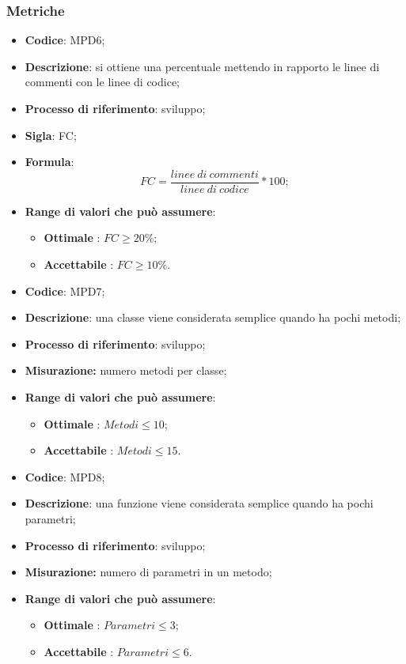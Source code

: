 \subsubsection{Metriche}
\vspace{-1cm}
\begin{itemize}
	\item \textbf{Codice}: MPD6;
	\item \textbf{Descrizione}: si ottiene una percentuale mettendo in rapporto le linee di commenti con le linee di codice;
	\item \textbf{Processo di riferimento}: sviluppo;
	\item \textbf{Sigla}: FC;
	\item \textbf{Formula}: \[FC=\frac{linee \ di \ commenti}{linee \ di \ codice}\ast100;\]
	\item \textbf{Range di valori che può assumere}: 
		\begin{itemize}
			\item \textbf{Ottimale} : $FC \geq 20 \%$;
			\item \textbf{Accettabile} : $FC \geq 10 \%$.
		\end{itemize}
\end{itemize}
\vspace{-1cm}
\begin{itemize}
	\item \textbf{Codice}: MPD7;
	\item \textbf{Descrizione}: una classe viene considerata semplice quando ha pochi metodi;
	\item \textbf{Processo di riferimento}: sviluppo;
	\item \textbf{Misurazione:} numero metodi per classe;
	\item \textbf{Range di valori che può assumere}: 
		\begin{itemize}
			\item \textbf{Ottimale} : $Metodi \leq 10$;
			\item \textbf{Accettabile} : $Metodi \leq 15$.
		\end{itemize}
\end{itemize}
\vspace{-1cm}
\begin{itemize}
	\item \textbf{Codice}: MPD8;
	\item \textbf{Descrizione}: una funzione viene considerata semplice quando ha pochi parametri;
	\item \textbf{Processo di riferimento}: sviluppo;
	\item \textbf{Misurazione:} numero di parametri in un metodo;
	\item \textbf{Range di valori che può assumere}: 
		\begin{itemize}
			\item \textbf{Ottimale} : $Parametri \leq 3$;
			\item \textbf{Accettabile} : $Parametri \leq 6$.
		\end{itemize}
\end{itemize}
